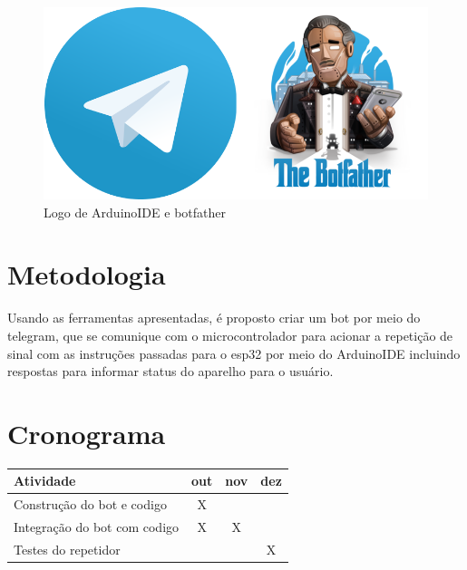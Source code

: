 \documentclass[12pt]{article}
\begin{document}
\begin{figure}[ht]
  \centering
  \includegraphics[width=.25\textwidth]{Images/header.png}
  \caption{Logo de ArduinoIDE e botfather}
  \label{fig:exampleTelegram}
\end{figure}

\section{Metodologia}
Usando as ferramentas apresentadas, é proposto criar um bot por meio do telegram, que se comunique com o microcontrolador para acionar a repetição de sinal
com as instruções passadas para o esp32 por meio do ArduinoIDE incluindo respostas para informar status do aparelho para o usuário.

\section{Cronograma}

\begin{table}[hb]
  \centering
  \begin{tabular}{|l|c|c|c|}
    \hline
    \rowcolor[HTML]{9B9B9B}
    Atividade                    & out & nov & dez \\ \hline
    \rowcolor[HTML]{C0C0C0}
    Construção do bot e codigo   & X   &     &     \\ \hline
    \rowcolor[HTML]{C0C0C0}
    Integração do bot com codigo & X   & X   &     \\ \hline
    \rowcolor[HTML]{C0C0C0}
    Testes do repetidor          &     &     & X   \\ \hline
  \end{tabular}
\end{table}


\end{document}
